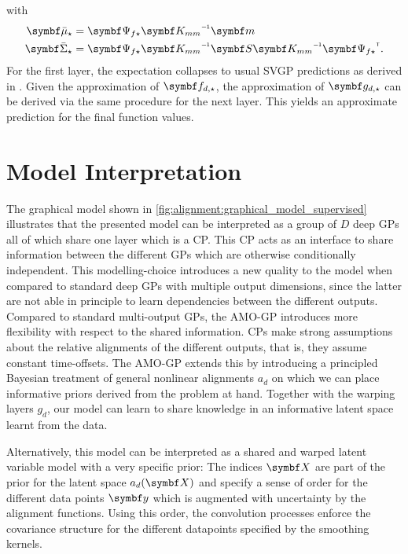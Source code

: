 with 
\begin{align*}
    \mat{\bar{\mu}_{\star}}    & = \mat{\Psi_{f\star}} \mat{K_{mm}}\inv \mat{m}                                        \\
    \mat{\bar{\Sigma}_{\star}} & = \mat{\Psi_{f\star}}\mat{K_{mm}}\inv\mat{S}\mat{K_{mm}}\inv\mat{\Psi_{f\star}}\tran.
\end{align*}
For the first layer, the expectation collapses to usual SVGP predictions as derived in \cite{hensman_scalable_2015}.
Given the approximation of $\rv{f_{d, \star}}$, the approximation of $\rv{g_{d, \star}}$ can be derived via the same procedure for the next layer.
This yields an approximate prediction for the final function values.


\section{Model Interpretation}
\label{toc:alignment:interpretation}
The graphical model shown in \cref{fig:alignment:graphical_model_supervised} illustrates that the presented model can be interpreted as a group of $D$ deep GPs all of which share one layer which is a CP.
This CP acts as an interface to share information between the different GPs which are otherwise conditionally independent.
This modelling-choice introduces a new quality to the model when compared to standard deep GPs with multiple output dimensions, since the latter are not able in principle to learn dependencies between the different outputs.
Compared to standard multi-output GPs, the AMO-GP introduces more flexibility with respect to the shared information.
CPs make strong assumptions about the relative alignments of the different outputs, that is, they assume constant time-offsets.
The AMO-GP extends this by introducing a principled Bayesian treatment of general nonlinear alignments $a_d$ on which we can place informative priors derived from the problem at hand.
Together with the warping layers $g_d$, our model can learn to share knowledge in an informative latent space learnt from the data.

Alternatively, this model can be interpreted as a shared and warped latent variable model with a very specific prior:
The indices $\mat{X}$ are part of the prior for the latent space $a_d(\mat{X})$ and specify a sense of order for the different data points $\mat{y}$ which is augmented with uncertainty by the alignment functions.
Using this order, the convolution processes enforce the covariance structure for the different datapoints specified by the smoothing kernels.

